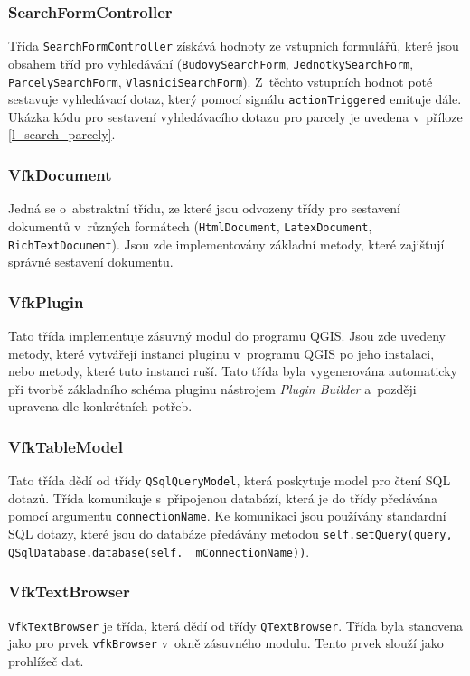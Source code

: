 \documentclass[a4paper,12pt,oneside]{book}
\begin{document}
\subsubsection{SearchFormController}
Třída \texttt{SearchFormController} získává hodnoty ze vstupních formulářů, které jsou obsahem tříd pro vyhledávání  (\texttt{BudovySearchForm}, \texttt{JednotkySearchForm}, \texttt{Par\-celySearchForm}, \texttt{VlasniciSearchForm}). Z~těchto vstupních hodnot poté sestavuje vyhledávací dotaz, který pomocí signálu \texttt{actionTriggered} emituje dále. Ukázka kódu pro sestavení vyhledávacího dotazu pro parcely je uvedena v~příloze \ref{l_search_parcely}.

\subsubsection{VfkDocument}
\label{l_vfkDocument}
Jedná se o~abstraktní třídu, ze které jsou odvozeny třídy pro sestavení dokumentů v~různých formátech (\texttt{HtmlDocument}, \texttt{LatexDocument}, \texttt{RichTextDocument}). Jsou zde implementovány základní metody, které zajišťují správné sestavení dokumentu.

\subsubsection{VfkPlugin}
Tato třída implementuje zásuvný modul do programu QGIS. Jsou zde uvedeny metody, které vytvářejí instanci pluginu v~programu QGIS po jeho instalaci, nebo metody, které tuto instanci ruší. Tato třída byla vygenerována automaticky při tvorbě základního schéma pluginu nástrojem \textit{Plugin Builder} a~později upravena dle konkrétních potřeb.

\subsubsection{VfkTableModel}
Tato třída dědí od třídy \texttt{QSqlQueryModel}, která poskytuje model pro čtení SQL dotazů. Třída komunikuje s~připojenou databází, která je do třídy předávána pomocí argumentu \texttt{connectionName}. Ke komunikaci jsou používány standardní SQL dotazy, které jsou do databáze předávány metodou \texttt{self.setQuery(query, QSqlDatabase.database(self.\_\_mConnectionName))}.

\subsubsection{VfkTextBrowser}
\texttt{VfkTextBrowser} je třída, která dědí od třídy \texttt{QTextBrowser}. Třída byla stanovena jako  pro prvek \texttt{vfkBrowser} v~okně zásuvného modulu. Tento prvek slouží jako prohlížeč dat.
\end{document}
